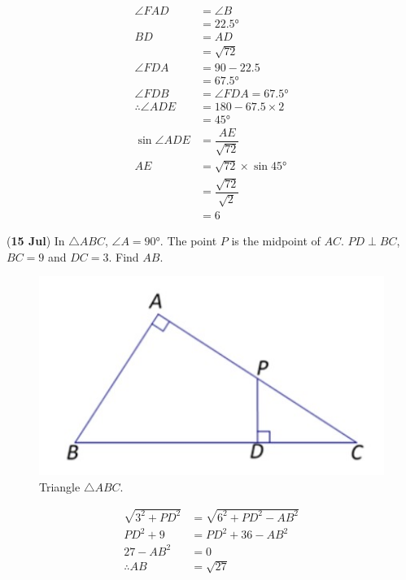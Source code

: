 \documentclass[12pt,answers]{exam}
\renewcommand{\frac}[2]{\dfrac{#1}{#2}}
\newcommand{\qndate}[2]{(\textbf{#1 #2})}
\begin{document}
\begin{questions}
  \begin{solution}
    \begin{align*}
      \angle FAD            & = \angle B                       \\
      & = \ang{22.5}                     \\
      BD                    & = AD                             \\
      & = \sqrt{72}                      \\
      \angle FDA            & = 90 - 22.5                      \\
      & = \ang{67.5}                     \\
      \angle FDB            & = \angle FDA = \ang{67.5}        \\
      \therefore \angle ADE & = 180 - 67.5 \times 2            \\
      & = \ang{45}                       \\
      \sin \angle ADE       & = \frac{AE}{\sqrt{72}}           \\
      AE                    & = \sqrt{72} \times \sin \ang{45} \\
      & = \frac{\sqrt{72}}{\sqrt{2}}     \\
      & = 6
    \end{align*}
  \end{solution}

  \question \qndate{15}{Jul} In $\triangle ABC$, $\angle A =
  \ang{90}$. The point
  $P$ is the midpoint of $AC$. $PD \perp BC$, $BC = 9$ and $DC = 3$.
  Find $AB$.
  \begin{figure}[htpb]
    \centering
    \includegraphics[scale=.5]{images/0715_Tri.jpeg}
    \caption{Triangle $\triangle ABC$.}
    \label{fig:0715_Tri}
  \end{figure}
  \begin{solution}
    \begin{align*}
      \sqrt{3^2 + {PD}^2} & = \sqrt{6^2 + {PD}^2 - {AB}^2} \\
      {PD}^2 + 9          & = {PD}^2 + 36 - {AB}^2         \\
      27 - {AB}^2         & = 0                            \\
      \therefore AB       & = \sqrt{27}
    \end{align*}
  \end{solution}


\end{questions}
\end{document}
